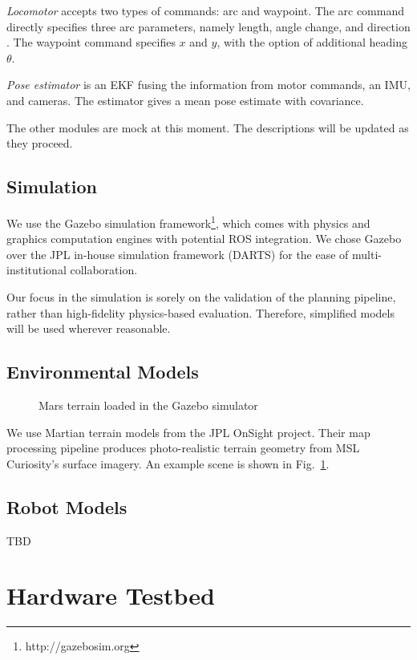 \documentclass[conference]{IEEEtran}
\begin{document}
\textit{Locomotor} accepts two types of commands: arc and waypoint. The arc command directly specifies three arc parameters, namely length, angle change, and direction . The waypoint command specifies $x$ and $y$, with the option of additional heading $\theta$. 

\textit{Pose estimator} is an EKF fusing the information from motor commands, an IMU, and cameras. The estimator gives a mean pose estimate with covariance.


The other modules are mock at this moment. The descriptions will be updated as they proceed. 




\subsection{Simulation}

We use the Gazebo simulation framework\footnote{http://gazebosim.org}, which comes with physics and graphics computation engines with potential ROS integration. We chose Gazebo over the JPL in-house simulation framework (DARTS) for the ease of multi-institutional collaboration. 

Our focus in the simulation is sorely on the validation of the planning pipeline, rather than high-fidelity physics-based evaluation. Therefore, simplified models will be used wherever reasonable.

\subsection{Environmental Models}

\begin{figure}
    \centering
    \caption{Mars terrain loaded in the Gazebo simulator}
    \label{fig:gazebo_scene}
\end{figure}

We use Martian terrain models from the JPL OnSight project. Their map processing pipeline produces photo-realistic terrain geometry from MSL Curiosity's surface imagery. An example scene is shown in Fig.~\ref{fig:gazebo_scene}.

\subsection{Robot Models}
TBD


\section{Hardware Testbed}
\end{document}
